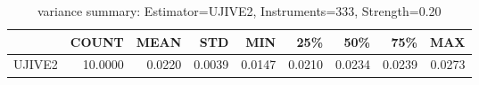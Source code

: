 \begin{table}[ht]
\centering
\caption{variance summary: Estimator=UJIVE2, Instruments=333, Strength=0.20}
\begin{tabular}{lrrrrrrrr}
\toprule
 & COUNT & MEAN & STD & MIN & 25\% & 50\% & 75\% & MAX \\
\midrule
UJIVE2 & 10.0000 & 0.0220 & 0.0039 & 0.0147 & 0.0210 & 0.0234 & 0.0239 & 0.0273 \\
\bottomrule
\end{tabular}
\end{table}
